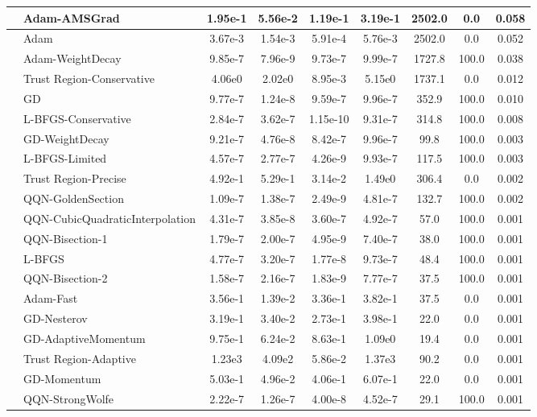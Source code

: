 \documentclass[10pt]{article}
\begin{document}
\begin{longtable}{|l|l|c|c|c|c|c|c|c|}
\hline
 & Adam-AMSGrad & 1.95e-1 & 5.56e-2 & 1.19e-1 & 3.19e-1 & 2502.0 & 0.0 & 0.058 \\
\hline
 & Adam & 3.67e-3 & 1.54e-3 & 5.91e-4 & 5.76e-3 & 2502.0 & 0.0 & 0.052 \\
\hline
 & Adam-WeightDecay & 9.85e-7 & 7.96e-9 & 9.73e-7 & 9.99e-7 & 1727.8 & 100.0 & 0.038 \\
\hline
 & Trust Region-Conservative & 4.06e0 & 2.02e0 & 8.95e-3 & 5.15e0 & 1737.1 & 0.0 & 0.012 \\
\hline
 & GD & 9.77e-7 & 1.24e-8 & 9.59e-7 & 9.96e-7 & 352.9 & 100.0 & 0.010 \\
\hline
 & L-BFGS-Conservative & 2.84e-7 & 3.62e-7 & 1.15e-10 & 9.31e-7 & 314.8 & 100.0 & 0.008 \\
\hline
 & GD-WeightDecay & 9.21e-7 & 4.76e-8 & 8.42e-7 & 9.96e-7 & 99.8 & 100.0 & 0.003 \\
\hline
 & L-BFGS-Limited & 4.57e-7 & 2.77e-7 & 4.26e-9 & 9.93e-7 & 117.5 & 100.0 & 0.003 \\
\hline
 & Trust Region-Precise & 4.92e-1 & 5.29e-1 & 3.14e-2 & 1.49e0 & 306.4 & 0.0 & 0.002 \\
\hline
 & QQN-GoldenSection & 1.09e-7 & 1.38e-7 & 2.49e-9 & 4.81e-7 & 132.7 & 100.0 & 0.002 \\
\hline
 & QQN-CubicQuadraticInterpolation & 4.31e-7 & 3.85e-8 & 3.60e-7 & 4.92e-7 & 57.0 & 100.0 & 0.001 \\
\hline
 & QQN-Bisection-1 & 1.79e-7 & 2.00e-7 & 4.95e-9 & 7.40e-7 & 38.0 & 100.0 & 0.001 \\
\hline
 & L-BFGS & 4.77e-7 & 3.20e-7 & 1.77e-8 & 9.73e-7 & 48.4 & 100.0 & 0.001 \\
\hline
 & QQN-Bisection-2 & 1.58e-7 & 2.16e-7 & 1.83e-9 & 7.77e-7 & 37.5 & 100.0 & 0.001 \\
\hline
 & Adam-Fast & 3.56e-1 & 1.39e-2 & 3.36e-1 & 3.82e-1 & 37.5 & 0.0 & 0.001 \\
\hline
 & GD-Nesterov & 3.19e-1 & 3.40e-2 & 2.73e-1 & 3.98e-1 & 22.0 & 0.0 & 0.001 \\
\hline
 & GD-AdaptiveMomentum & 9.75e-1 & 6.24e-2 & 8.63e-1 & 1.09e0 & 19.4 & 0.0 & 0.001 \\
\hline
 & Trust Region-Adaptive & 1.23e3 & 4.09e2 & 5.86e-2 & 1.37e3 & 90.2 & 0.0 & 0.001 \\
\hline
 & GD-Momentum & 5.03e-1 & 4.96e-2 & 4.06e-1 & 6.07e-1 & 22.0 & 0.0 & 0.001 \\
\hline
 & QQN-StrongWolfe & 2.22e-7 & 1.26e-7 & 4.00e-8 & 4.52e-7 & 29.1 & 100.0 & 0.001 \\

\end{longtable}
\end{document}
